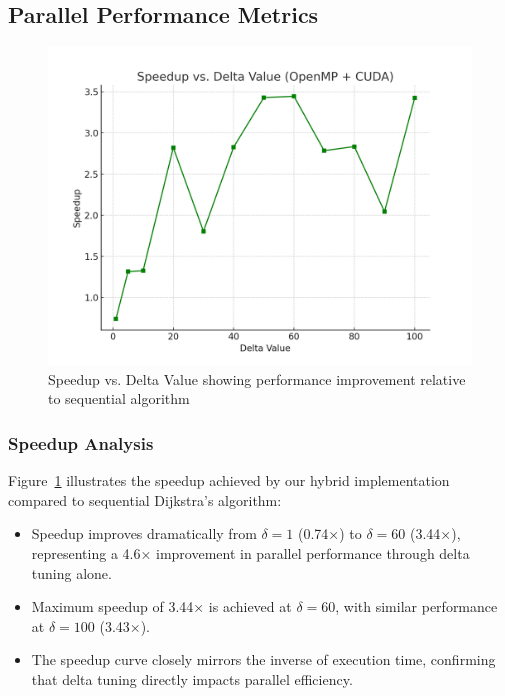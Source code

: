 \documentclass{article}
\begin{document}
\subsection*{Parallel Performance Metrics}

\begin{figure}[ht]
    \centering
    \includegraphics[width=\linewidth]{speedup_vs_delta.png}
    \caption{Speedup vs. Delta Value showing performance improvement relative to sequential algorithm}
    \label{fig:speedup_delta}
\end{figure}

\subsubsection*{Speedup Analysis}

Figure~\ref{fig:speedup_delta} illustrates the speedup achieved by our hybrid implementation compared to sequential Dijkstra's algorithm:

\begin{itemize}
    \item Speedup improves dramatically from $\delta=1$ (0.74×) to $\delta=60$ (3.44×), representing a 4.6× improvement in parallel performance through delta tuning alone.
    
    \item Maximum speedup of 3.44× is achieved at $\delta=60$, with similar performance at $\delta=100$ (3.43×).
    
    \item The speedup curve closely mirrors the inverse of execution time, confirming that delta tuning directly impacts parallel efficiency.
\end{itemize}
\end{document}
